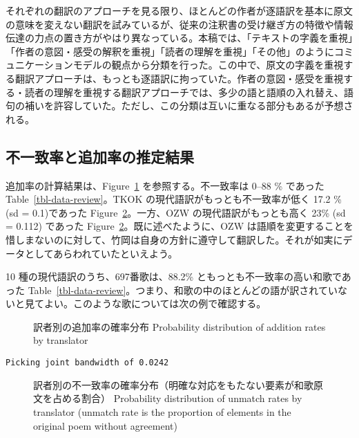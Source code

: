 \documentclass[
  letterpaper,
  DIV=11,
  numbers=noendperiod]{scrartcl}
\begin{document}
それぞれの翻訳のアプローチを見る限り、ほとんどの作者が逐語訳を基本に原文の意味を変えない翻訳を試みているが、従来の注釈書の受け継ぎ方の特徴や情報伝達の力点の置き方がやはり異なっている。本稿では、「テキストの字義を重視」「作者の意図・感受の解釈を重視」「読者の理解を重視」「その他」のようにコミュニケーションモデルの観点から分類を行った。この中で、原文の字義を重視する翻訳アプローチは、もっとも逐語訳に拘っていた。作者の意図・感受を重視する・読者の理解を重視する翻訳アプローチでは、多少の語と語順の入れ替え、語句の補いを許容していた。ただし、この分類は互いに重なる部分もあるが予想される。

\subsection{不一致率と追加率の推定結果}\label{ux4e0dux4e00ux81f4ux7387ux3068ux8ffdux52a0ux7387ux306eux63a8ux5b9aux7d50ux679c}

追加率の計算結果は、Figure~\ref{fig-data} を参照する。不一致率は 0--88
\% であった Table~\ref{tbl-data-review}。TKOK
の現代語訳がもっとも不一致率が低く 17.2 \% (sd = 0.1)であった
Figure~\ref{fig-unmatch-rate}。一方、OZW の現代語訳がもっとも高く 23\%
(sd = 0.112) であった
Figure~\ref{fig-unmatch-rate}。既に述べたように、OZW
は語順を変更することを惜しまないのに対して、竹岡は自身の方針に遵守して翻訳した。それが如実にデータとしてあらわれていたといえよう。

10 種の現代語訳のうち、697番歌は、88.2\%
ともっとも不一致率の高い和歌であった
Table~\ref{tbl-data-review}。つまり、和歌の中のほとんどの語が訳されていないと見てよい。このような歌については次の例で確認する。

\begin{figure}


\caption[訳者別の追加率の確率分布]{\label{fig-data}訳者別の追加率の確率分布
Probability distribution of addition rates by translator}

\end{figure}%

\begin{verbatim}
Picking joint bandwidth of 0.0242
\end{verbatim}

\begin{figure}


\caption[不一致率（明確な対応をもたない要素が和歌原文を占める割合）の概要]{\label{fig-unmatch-rate}訳者別の不一致率の確率分布（明確な対応をもたない要素が和歌原文を占める割合）
Probability distribution of unmatch rates by translator (unmatch rate is
the proportion of elements in the original poem without agreement)}

\end{figure}%
\end{document}
